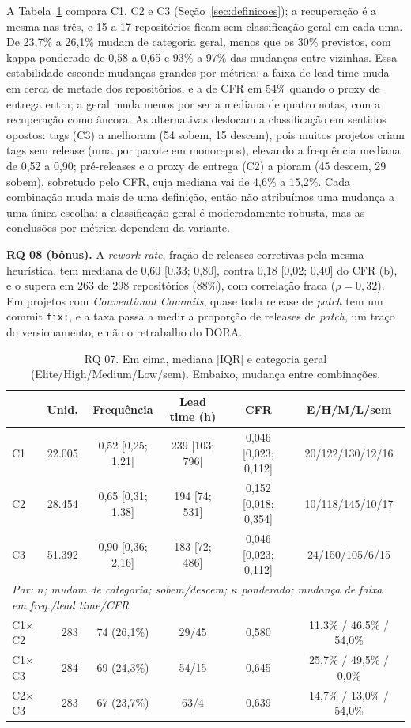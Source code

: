 \documentclass[12pt]{article}
\begin{document}
A Tabela~\ref{tab:rq07} compara C1, C2 e C3 (Seção~\ref{sec:definicoes}); a recuperação é a mesma nas três, e 15 a 17 repositórios ficam sem classificação geral em cada uma. De 23,7\% a 26,1\% mudam de categoria geral, menos que os 30\% previstos, com kappa ponderado de 0,58 a 0,65 e 93\% a 97\% das mudanças entre vizinhas. Essa estabilidade esconde mudanças grandes por métrica: a faixa de lead time muda em cerca de metade dos repositórios, e a de CFR em 54\% quando o proxy de entrega entra; a geral muda menos por ser a mediana de quatro notas, com a recuperação como âncora. As alternativas deslocam a classificação em sentidos opostos: tags (C3) a melhoram (54 sobem, 15 descem), pois muitos projetos criam tags sem release (uma por pacote em monorepos), elevando a frequência mediana de 0,52 a 0,90; pré-releases e o proxy de entrega (C2) a pioram (45 descem, 29 sobem), sobretudo pelo CFR, cuja mediana vai de 4,6\% a 15,2\%. Cada combinação muda mais de uma definição, então não atribuímos uma mudança a uma única escolha: a classificação geral é moderadamente robusta, mas as conclusões por métrica dependem da variante.

\textbf{RQ 08 (bônus).} A \emph{rework rate}, fração de releases corretivas pela mesma heurística, tem mediana de 0,60 [0,33; 0,80], contra 0,18 [0,02; 0,40] do CFR (b), e o supera em 263 de 298 repositórios (88\%), com correlação fraca ($\rho=0{,}32$). Em projetos com \emph{Conventional Commits}, quase toda release de \emph{patch} tem um commit \texttt{fix:}, e a taxa passa a medir a proporção de releases de \emph{patch}, um traço do versionamento, e não o retrabalho do DORA.

\begin{table}[!t]
\centering
\footnotesize
\setlength{\tabcolsep}{2.5pt}
\caption{RQ 07. Em cima, mediana [IQR] e categoria geral (Elite/High/Medium/Low/sem). Embaixo, mudança entre combinações.}
\label{tab:rq07}
\begin{tabular}{lrcccc}
\toprule
 & Unid. & Frequência & Lead time (h) & CFR & E/H/M/L/sem \\
\midrule
C1 & 22.005 & 0,52 [0,25; 1,21] & 239 [103; 796] & 0,046 [0,023; 0,112] & 20/122/130/12/16 \\
C2 & 28.454 & 0,65 [0,31; 1,38] & 194 [74; 531]  & 0,152 [0,018; 0,354] & 10/118/145/10/17 \\
C3 & 51.392 & 0,90 [0,36; 2,16] & 183 [72; 486]  & 0,046 [0,023; 0,112] & 24/150/105/6/15 \\
\midrule
\multicolumn{6}{l}{\emph{Par: $n$; mudam de categoria; sobem/descem; $\kappa$ ponderado; mudança de faixa em freq./lead time/CFR}} \\
C1$\times$C2 & 283 & 74 (26,1\%) & 29/45 & 0,580 & 11,3\% / 46,5\% / 54,0\% \\
C1$\times$C3 & 284 & 69 (24,3\%) & 54/15 & 0,645 & 25,7\% / 49,5\% / 0,0\% \\
C2$\times$C3 & 283 & 67 (23,7\%) & 63/4  & 0,639 & 14,7\% / 13,0\% / 54,0\% \\
\bottomrule
\end{tabular}
\end{table}
\end{document}
